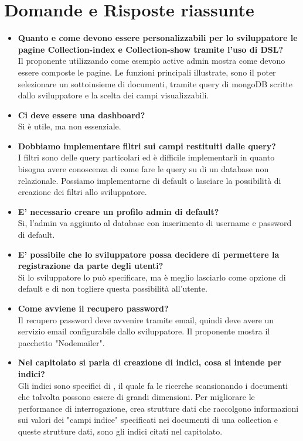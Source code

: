 \section{Domande e Risposte riassunte}
	\begin{itemize} 
		\item 
		{\bfseries Quanto e come devono essere personalizzabili per lo sviluppatore le pagine Collection-index
		e Collection-show tramite l'uso di DSL?} \\
		Il proponente utilizzando come esempio active admin mostra come devono essere composte le pagine.
		Le funzioni principali illustrate, sono il poter selezionare un sottoinsieme di documenti, tramite query di mongoDB scritte
		dallo sviluppatore e la scelta dei campi visualizzabili.	
		
		\item 
		{\bfseries Ci deve essere una dashboard?} \\
		Si è utile, ma non essenziale. 
		
		\item
		{\bfseries Dobbiamo implementare filtri sui campi restituiti dalle query?} \\
		I filtri sono delle query particolari ed è difficile implementarli in quanto bisogna avere conoscenza di come fare le query su di un database non relazionale.
		Possiamo implementarne di default o lasciare la possibilità di creazione dei filtri allo sviluppatore.
		
		\item
		{\bfseries E' necessario creare un profilo admin di default?} \\
		Si, l'admin va aggiunto al database con inserimento di username e password di default.
		
		\item
		{\bfseries E' possibile che lo sviluppatore possa decidere di permettere la registrazione da parte degli utenti?} \\
		 Si lo sviluppatore lo può specificare, ma è meglio lasciarlo come opzione di default e di non togliere questa possibilità
		 all'utente.
		
		\item
		{\bfseries Come avviene il recupero password?} \\
		Il recupero password deve avvenire tramite email, quindi \ProjectName  deve avere un servizio email configurabile dallo sviluppatore.
		Il proponente mostra il pacchetto "Nodemailer".
		
		\item
		{\bfseries Nel capitolato si parla di creazione di indici, cosa si intende per indici?} \\
		Gli indici sono specifici di , il quale fa le ricerche scansionando i documenti che talvolta possono essere di grandi dimensioni. Per migliorare le performance di interrogazione,  crea strutture dati che raccolgono informazioni sui valori dei "campi indice" specificati nei documenti di una collection e queste strutture dati, sono gli indici citati nel capitolato.
		

\end{itemize}

